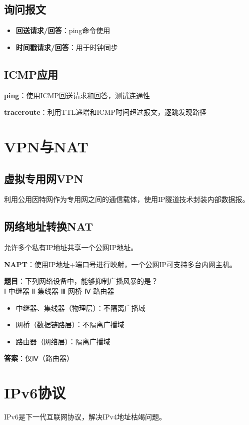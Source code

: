 \subsection{询问报文}
\begin{itemize}[leftmargin=2em,itemsep=0pt]
    \item \textbf{回送请求/回答}：ping命令使用
    \item \textbf{时间戳请求/回答}：用于时钟同步
\end{itemize}

\subsection{ICMP应用}
\textbf{ping}：使用ICMP回送请求和回答，测试连通性

\textbf{traceroute}：利用TTL递增和ICMP时间超过报文，逐跳发现路径

\section{VPN与NAT}
\subsection{虚拟专用网VPN}
利用公用因特网作为专用网之间的通信载体，使用IP隧道技术封装内部数据报。

\subsection{网络地址转换NAT}
允许多个私有IP地址共享一个公网IP地址。

\textbf{NAPT}：使用IP地址+端口号进行映射，一个公网IP可支持多台内网主机。

\begin{examplebox}[例题4.7 网络设备与广播域]
\textbf{题目}：下列网络设备中，能够抑制广播风暴的是？\\
Ⅰ 中继器 \quad Ⅱ 集线器 \quad Ⅲ 网桥 \quad Ⅳ 路由器
\tcblower
\begin{itemize}[itemsep=0pt]
    \item 中继器、集线器（物理层）：不隔离广播域
    \item 网桥（数据链路层）：不隔离广播域
    \item 路由器（网络层）：隔离广播域
\end{itemize}
\textbf{答案}：仅Ⅳ（路由器）
\end{examplebox}

\section{IPv6协议}
IPv6是下一代互联网协议，解决IPv4地址枯竭问题。

